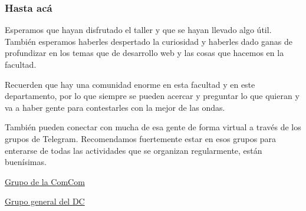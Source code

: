 \begin{frame}
    \frametitle{Hasta acá}

    Esperamos que hayan disfrutado el taller y que se hayan llevado algo útil. También 
    esperamos haberles despertado la curiosidad y haberles dado ganas de profundizar en 
    los temas que de desarrollo web y las cosas que hacemos en la facultad.

    Recuerden que hay una comunidad enorme en esta facultad y en este departamento, por 
    lo que siempre se pueden acercar y preguntar lo que quieran y va a haber gente para 
    contestarles con la mejor de las ondas.

    También pueden conectar con mucha de esa gente de forma virtual a través de los 
    grupos de Telegram. Recomendamos fuertemente estar en esos grupos para enterarse de 
    todas las actividades que se organizan regularmente, están buenísimas.

    \href{https://t.me/comcomdcuba}{Grupo de la ComCom}

    \href{https://t.me/+oDiLv44I7b5jMjZh}{Grupo general del DC}

\end{frame}